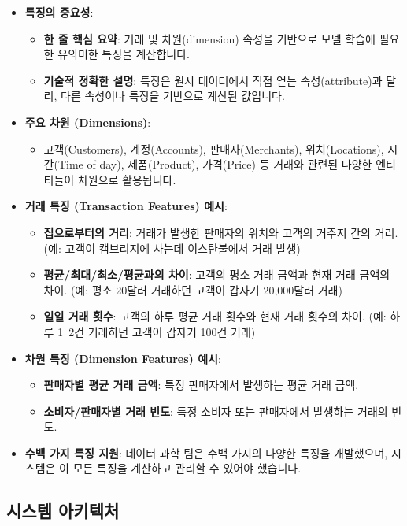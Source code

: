 \documentclass[11pt,a4paper]{article}
\begin{document}
\begin{itemize}
\begin{itemize}
\begin{itemize}
\begin{itemize}
\begin{itemize}
    \item \textbf{특징의 중요성}:
    \begin{itemize}
        \item \textbf{한 줄 핵심 요약}: 거래 및 차원(dimension) 속성을 기반으로 모델 학습에 필요한 유의미한 특징을 계산합니다.
        \item \textbf{기술적 정확한 설명}: 특징은 원시 데이터에서 직접 얻는 속성(attribute)과 달리, 다른 속성이나 특징을 기반으로 계산된 값입니다.
    \end{itemize}
    \item \textbf{주요 차원 (Dimensions)}:
    \begin{itemize}
        \item 고객(Customers), 계정(Accounts), 판매자(Merchants), 위치(Locations), 시간(Time of day), 제품(Product), 가격(Price) 등 거래와 관련된 다양한 엔티티들이 차원으로 활용됩니다.
    \end{itemize}
    \item \textbf{거래 특징 (Transaction Features) 예시}:
    \begin{itemize}
        \item \textbf{집으로부터의 거리}: 거래가 발생한 판매자의 위치와 고객의 거주지 간의 거리. (예: 고객이 캠브리지에 사는데 이스탄불에서 거래 발생)
        \item \textbf{평균/최대/최소/평균과의 차이}: 고객의 평소 거래 금액과 현재 거래 금액의 차이. (예: 평소 20달러 거래하던 고객이 갑자기 20,000달러 거래)
        \item \textbf{일일 거래 횟수}: 고객의 하루 평균 거래 횟수와 현재 거래 횟수의 차이. (예: 하루 1~2건 거래하던 고객이 갑자기 100건 거래)
    \end{itemize}
    \item \textbf{차원 특징 (Dimension Features) 예시}:
    \begin{itemize}
        \item \textbf{판매자별 평균 거래 금액}: 특정 판매자에서 발생하는 평균 거래 금액.
        \item \textbf{소비자/판매자별 거래 빈도}: 특정 소비자 또는 판매자에서 발생하는 거래의 빈도.
    \end{itemize}
    \item \textbf{수백 가지 특징 지원}: 데이터 과학 팀은 수백 가지의 다양한 특징을 개발했으며, 시스템은 이 모든 특징을 계산하고 관리할 수 있어야 했습니다.
\end{itemize}

\subsection*{시스템 아키텍처}


\end{itemize}
\end{itemize}
\end{itemize}
\end{itemize}
\end{document}
